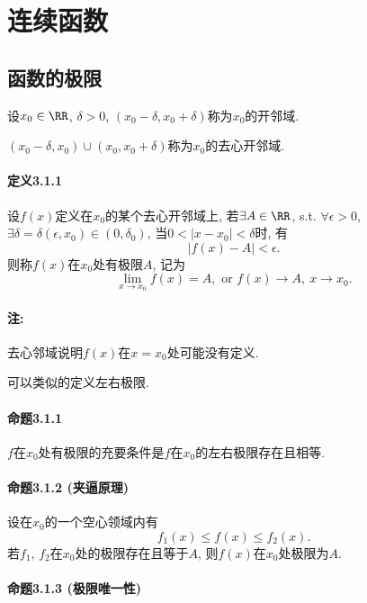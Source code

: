 
\section{连续函数}

\subsection{函数的极限}

设$x_{0}\in\RR$, $\delta>0$, $\left(x_{0}-\delta,x_{0}+\delta\right)$称为$x_{0}$的开邻域.

$\left(x_{0}-\delta,x_{0}\right)\cup\left(x_{0},x_{0}+\delta\right)$称为$x_{0}$的去心开邻域.

\paragraph{定义3.1.1}

设$f(x)$定义在$x_{0}$的某个去心开邻域上, 若$\exists A\in\RR$, s.t. $\forall\epsilon>0$,
$\exists\delta=\delta(\epsilon,x_{0})\in(0,\delta_{0})$, 当$0<\left|x-x_{0}\right|<\delta$时,
有
\[
\left|f(x)-A\right|<\epsilon.
\]
则称$f(x)$在$x_{0}$处有极限$A$, 记为
\[
\lim_{x\to x_{0}}f(x)=A,\text{ or }f(x)\to A,\ x\to x_{0}.
\]


\paragraph{注: }

去心邻域说明$f(x)$在$x=x_{0}$处可能没有定义.

可以类似的定义左右极限.

\paragraph{命题3.1.1}

$f$在$x_{0}$处有极限的充要条件是$f$在$x_{0}$的左右极限存在且相等.

\paragraph{命题3.1.2 (夹逼原理)}

设在$x_{0}$的一个空心领域内有
\[
f_{1}(x)\le f(x)\le f_{2}(x).
\]
若$f_{1}$, $f_{2}$在$x_{0}$处的极限存在且等于$A$, 则$f(x)$在$x_{0}$处极限为$A$.

\paragraph{命题3.1.3 (极限唯一性)}

